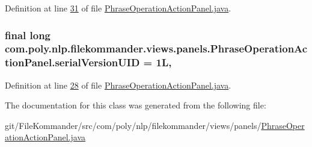 Definition at line \hyperlink{L31}{31} of file \hyperlink{}{Phrase\-Operation\-Action\-Panel.\-java}.

\hypertarget{classcom_1_1poly_1_1nlp_1_1filekommander_1_1views_1_1panels_1_1_phrase_operation_action_panel_a422015c9557a6c51405b4eab27b52452}{
\subsubsection[{serial\-Version\-U\-I\-D}]{\setlength{\rightskip}{0pt plus 5cm}final long com.\-poly.\-nlp.\-filekommander.\-views.\-panels.\-Phrase\-Operation\-Action\-Panel.\-serial\-Version\-U\-I\-D = 1\-L\hspace{0.3cm}{\ttfamily [static]}, {\ttfamily [private]}}}\label{classcom_1_1poly_1_1nlp_1_1filekommander_1_1views_1_1panels_1_1_phrase_operation_action_panel_a422015c9557a6c51405b4eab27b52452}


Definition at line \hyperlink{L28}{28} of file \hyperlink{}{Phrase\-Operation\-Action\-Panel.\-java}.



The documentation for this class was generated from the following file\-:\begin{DoxyCompactItemize}
\item 
git/\-File\-Kommander/src/com/poly/nlp/filekommander/views/panels/\hyperlink{_phrase_operation_action_panel_8java}{Phrase\-Operation\-Action\-Panel.\-java}\end{DoxyCompactItemize}
